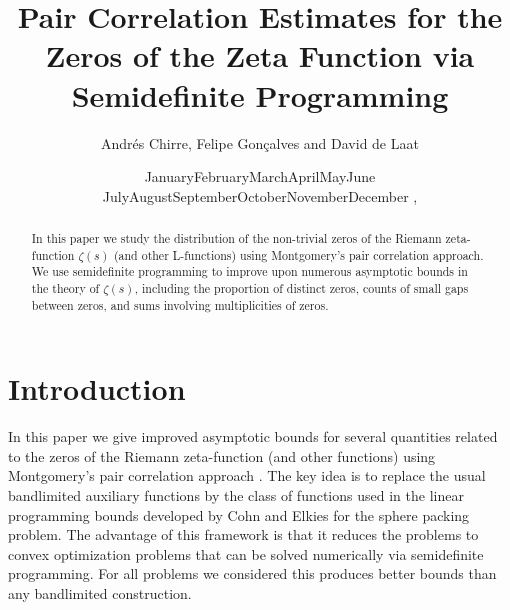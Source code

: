 \documentclass[reqno]{amsart}
\def\today{\ifcase\month\or
  January\or February\or March\or April\or May\or June\or
  July\or August\or September\or October\or November\or December\fi
  \space\number\day, \number\year}
\begin{document}

\title[]{Pair Correlation Estimates for the Zeros of the Zeta Function via Semidefinite Programming}
\author[Chirre, Gon\c{c}alves and de Laat]{Andr\'es Chirre, Felipe Gon\c{c}alves and David de Laat}
\date{\today}
\subjclass[2010]{}
\keywords{}
\address{IMPA - Instituto Nacional de Matem\'{a}tica Pura e Aplicada - Estrada Dona Castorina, 110, Rio de Janeiro, RJ, Brazil 22460-320}
\address{Hausdorff Center for Mathematics, Universit\"at Bonn, Endenicher Allee 60, 53115 Bonn, Germany}
\address{Massachusetts Institute of Technology, Department of Mathematics, 77 Massachusetts Avenue, Simons building (Building 2), Room 2-241}


\begin{abstract}
In this paper we study the distribution of the non-trivial zeros of the Riemann zeta-function $\zeta(s)$ (and other L-functions) using Montgomery's pair correlation approach. We use semidefinite programming to improve upon numerous asymptotic
bounds in the theory of $\zeta(s)$, including the proportion of
distinct zeros, counts of small gaps between zeros, and sums involving multiplicities of zeros.
\end{abstract}


\maketitle


\section{Introduction}

In this paper we give improved asymptotic bounds for several quantities related to the zeros of the Riemann zeta-function (and other functions) using Montgomery's pair correlation approach \cite{M}. The key idea is to replace the usual bandlimited auxiliary functions by the class of functions used in the linear programming bounds developed by Cohn and Elkies \cite{CE} for the sphere packing problem. The advantage of this framework is that it reduces the problems to convex optimization problems that can be solved numerically via semidefinite programming. For all problems we considered this produces better bounds than any bandlimited construction.
\end{document}
